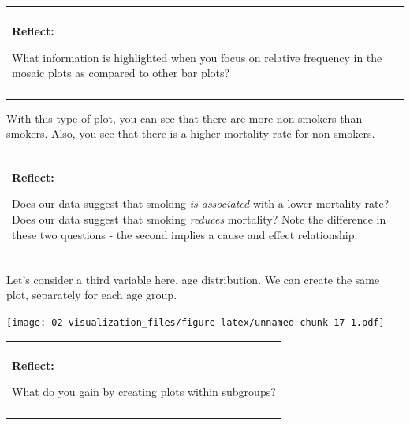 \documentclass[
]{book}
\newenvironment{Shaded}{\begin{snugshade}}{\end{snugshade}}
\newcommand{\DataTypeTok}[1]{\textcolor[rgb]{0.13,0.29,0.53}{#1}}
\newcommand{\KeywordTok}[1]{\textcolor[rgb]{0.13,0.29,0.53}{\textbf{#1}}}
\newcommand{\NormalTok}[1]{#1}
\newcommand{\OperatorTok}[1]{\textcolor[rgb]{0.81,0.36,0.00}{\textbf{#1}}}
\newcommand{\StringTok}[1]{\textcolor[rgb]{0.31,0.60,0.02}{#1}}
\newenvironment{reflect}
{
    \begin{center}
    
    \begin{tabular}{|p{0.8\textwidth}|}
    \rowcolor{LightBlue}
    \hline\\
    \rowcolor{LightBlue}
    \textbf{Reflect:}
}
{
    \\\rowcolor{LightBlue}
    \\\hline
    \end{tabular} 
    \end{center}
}
\begin{document}
\begin{reflect}
What information is highlighted when you focus on relative frequency in
the mosaic plots as compared to other bar plots?
\end{reflect}

With this type of plot, you can see that there are more non-smokers than smokers. Also, you see that there is a higher mortality rate for non-smokers.

\begin{reflect}
Does our data suggest that smoking \emph{is associated} with a lower
mortality rate? Does our data suggest that smoking \emph{reduces}
mortality? Note the difference in these two questions - the second
implies a cause and effect relationship.
\end{reflect}

Let's consider a third variable here, age distribution. We can create the same plot, separately for each age group.

\begin{Shaded}
\end{Shaded}

\texttt{[image: 02-visualization\_files/figure-latex/unnamed-chunk-17-1.pdf]}

\begin{reflect}
What do you gain by creating plots within subgroups?
\end{reflect}
\end{document}
